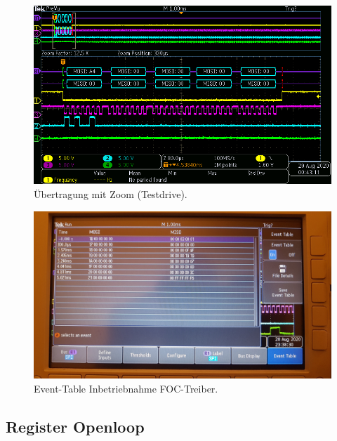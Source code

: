 \begin{figure}[H]
\center
\includegraphics[width = \textwidth]{graphics/TMC4671_TestDrive4}
\caption{Übertragung mit Zoom (Testdrive).}
\label{fig:TMC4671_TestDrive4}
\end{figure}
%

\begin{figure}[H]
\center
\includegraphics[width = \textwidth]{graphics/TMC4671_TimeTable_Lesen_Bild}
\caption{Event-Table Inbetriebnahme FOC-Treiber.}
\label{fig:TMC4671_TimeTable_Lesen_Bild}
\end{figure}

\newpage

\subsection{Register Openloop}\label{Appendix:TMC4671_Register}

